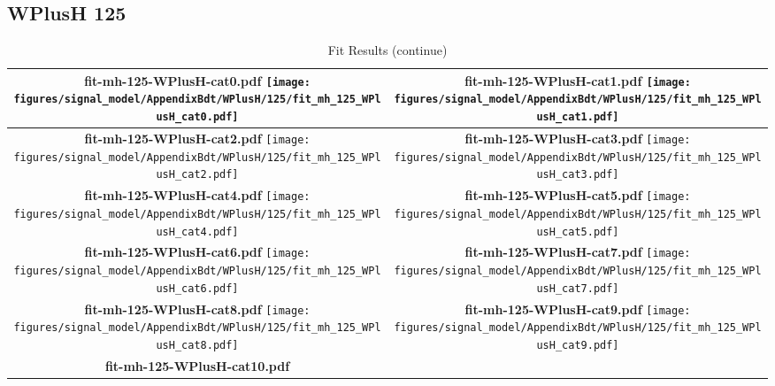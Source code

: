 \subsection{WPlusH 125}
\begin{longtable}{|c|c|}
\caption{Fit Results}
\endfirsthead
\caption{Fit Results (continue)}
\endhead
\hline
\parbox{0.47\textwidth}{
\centering
{\bfseries fit-mh-125-WPlusH-cat0.pdf}
\texttt{[image: figures/signal\_model/AppendixBdt/WPlusH/125/fit\_mh\_125\_WPlusH\_cat0.pdf]}
}
 & \parbox{0.47\textwidth}{
\centering
{\bfseries fit-mh-125-WPlusH-cat1.pdf}
\texttt{[image: figures/signal\_model/AppendixBdt/WPlusH/125/fit\_mh\_125\_WPlusH\_cat1.pdf]}
}
 \\
\hline
\parbox{0.47\textwidth}{
\centering
{\bfseries fit-mh-125-WPlusH-cat2.pdf}
\texttt{[image: figures/signal\_model/AppendixBdt/WPlusH/125/fit\_mh\_125\_WPlusH\_cat2.pdf]}
}
 & \parbox{0.47\textwidth}{
\centering
{\bfseries fit-mh-125-WPlusH-cat3.pdf}
\texttt{[image: figures/signal\_model/AppendixBdt/WPlusH/125/fit\_mh\_125\_WPlusH\_cat3.pdf]}
}
 \\
\hline
\parbox{0.47\textwidth}{
\centering
{\bfseries fit-mh-125-WPlusH-cat4.pdf}
\texttt{[image: figures/signal\_model/AppendixBdt/WPlusH/125/fit\_mh\_125\_WPlusH\_cat4.pdf]}
}
 & \parbox{0.47\textwidth}{
\centering
{\bfseries fit-mh-125-WPlusH-cat5.pdf}
\texttt{[image: figures/signal\_model/AppendixBdt/WPlusH/125/fit\_mh\_125\_WPlusH\_cat5.pdf]}
}
 \\
\hline
\parbox{0.47\textwidth}{
\centering
{\bfseries fit-mh-125-WPlusH-cat6.pdf}
\texttt{[image: figures/signal\_model/AppendixBdt/WPlusH/125/fit\_mh\_125\_WPlusH\_cat6.pdf]}
}
 & \parbox{0.47\textwidth}{
\centering
{\bfseries fit-mh-125-WPlusH-cat7.pdf}
\texttt{[image: figures/signal\_model/AppendixBdt/WPlusH/125/fit\_mh\_125\_WPlusH\_cat7.pdf]}
}
 \\
\hline
\parbox{0.47\textwidth}{
\centering
{\bfseries fit-mh-125-WPlusH-cat8.pdf}
\texttt{[image: figures/signal\_model/AppendixBdt/WPlusH/125/fit\_mh\_125\_WPlusH\_cat8.pdf]}
}
 & \parbox{0.47\textwidth}{
\centering
{\bfseries fit-mh-125-WPlusH-cat9.pdf}
\texttt{[image: figures/signal\_model/AppendixBdt/WPlusH/125/fit\_mh\_125\_WPlusH\_cat9.pdf]}
}
 \\
\hline
\parbox{0.47\textwidth}{
\centering
{\bfseries fit-mh-125-WPlusH-cat10.pdf}
}
\end{longtable}

